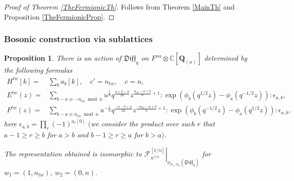 \documentclass[pdftex]{sigma}
\numberwithin{equation}{section}
\newtheorem{Proposition}[Theorem]{Proposition}
\theoremstyle{definition}
\newcommand{\qD}{\mathfrak{Diff}_q}
\newcommand{\Q}{\mathbf{Q}_{(n)}}
\begin{document}
\begin{proof}[Proof of Theorem \ref{TheFermionicTh}] Follows from Theorem \ref{MainTh} and Proposition \ref{TheFermionicProp}.
\end{proof}

\subsubsection{Bosonic construction via sublattices}

\begin{Proposition} \label{Prop:qD Boson}
There is an action of $\qD$ on $F^{na} \otimes \mathbb{C} [ \Q ]$ determined by the following formulas
\begin{align}
H^{tw}[k] =& \sum_{b} a_b [k], \quad c' = n_{tw}, \quad c=n, \label{eq1: Prop:qD Boson} \\
E^{tw}(z) =& \!\!\! \sum_{b-a \equiv -n_{tw} \bmod n} \!\!\!\!\! u^{\frac{1}{n}} q^{\frac{a+b-n}{2n}} z^{\frac{n_{tw}-a+b}{n}+1} : \! \exp \left( \phi_b(q^{1/2} z) - \phi_a(q^{-1/2} z) \right) \! : \epsilon_{a,b}, \\
F^{tw}(z) =& \!\!\! \sum_{b-a \equiv n_{tw} \bmod n} \!\!\!\!\! u^{-\frac{1}{n}} q^{ \frac{-a-b+n}{2n} } z^{\frac{-n_{tw}-a+b}{n}+1} : \! \exp \left( \phi_b(q^{-1/2} z) - \phi_a(q^{1/2} z) \right) \! : \epsilon_{a,b} , \label{eq3: Prop:qD Boson}
\end{align}
here $\epsilon_{a,b} = \prod_r (-1)^{a_r[0]}$ $($we consider the product over such $r$ that $a-1 \geqslant r \geqslant b$ for $a>b$ and $b-1 \geqslant r \geqslant a$ for $b>a)$.

The representation obtained is isomorphic to $\left. \mathcal{F}^{[1/n]}_{u^{1/n}} \right|_{\phi_{w_1, w_2}(\qD)}$ for $w_1=(1, n_{tw})$, $w_2=(0,n)$.
\end{Proposition}
\end{document}
